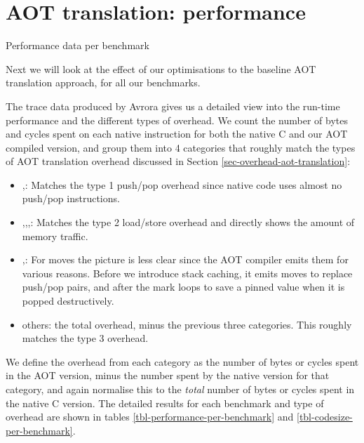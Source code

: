 \section{AOT translation: performance}
\label{sec-evaluation-aot-translation-performance}
\begin{landscape}
\begin{table}[]
 \centering
 \caption{Performance data per benchmark}
 \label{tbl-performance-per-benchmark}
 \small
 \scriptsize
 \setlength{\tabcolsep}{4pt}
 
 \setlength{\tabcolsep}{6pt}
\end{table}
\end{landscape}

Next we will look at the effect of our optimisations to the baseline AOT translation approach, for all our benchmarks.

The trace data produced by Avrora gives us a detailed view into the run-time performance and the different types of overhead. We count the number of bytes and cycles spent on each native instruction for both the native C and our AOT compiled version, and group them into 4 categories that roughly match the types of AOT translation overhead discussed in Section \ref{sec-overhead-aot-translation}:
\begin{itemize}
	\item {},: Matches the type 1 push/pop overhead since native code uses almost no push/pop instructions.
	\item {},,,: Matches the type 2 load/store overhead and directly shows the amount of memory traffic.
	\item {},: For moves the picture is less clear since the AOT compiler emits them for various reasons. Before we introduce stack caching, it emits moves to replace push/pop pairs, and after the mark loops to save a pinned value when it is popped destructively.
	\item others: the total overhead, minus the previous three categories. This roughly matches the type 3 overhead.
\end{itemize}

We define the overhead from each category as the number of bytes or cycles spent in the AOT version, minus the number spent by the native version for that category, and again normalise this to the \emph{total} number of bytes or cycles spent in the native C version. The detailed results for each benchmark and type of overhead are shown in tables \ref{tbl-performance-per-benchmark} and \ref{tbl-codesize-per-benchmark}.

